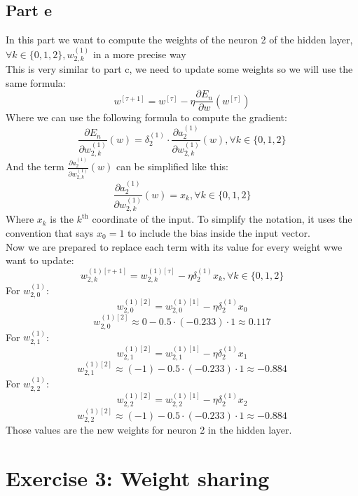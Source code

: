 \documentclass[a4paper, 10pt]{article}
\begin{document}
\subsection{Part e}
In this part we want to compute the weights of the neuron 2 of the hidden layer, $\forall k \in \{0,1,2\}, w_{2,k}^{(1)}$ in a more precise way 
\\
This is very similar to part c, we need to update some weights so we will use the same formula:
$$
w^{[\tau +1]} = w^{[\tau]} - \eta \frac{\partial E_n}{\partial w}(w^{[\tau]})
$$
Where we can use the following formula to compute the gradient:
$$
\frac{\partial E_n}{\partial w_{2,k}^{(1)}}(w) = \delta_2^{(1)} \cdot \frac{\partial a_2^{(1)}}{\partial w_{2,k}^{(1)}}(w),  \forall k\in\{0,1,2\} 
$$
And the term $\frac{\partial a_2^{(1)}}{\partial w_{2,k}^{(1)}}(w)$ can be simplified like this:
$$
\frac{\partial a_2^{(1)}}{\partial w_{2,k}^{(1)}}(w) = x_k, \forall k \in\{0,1,2\}
$$
Where $x_k$ is the $k^\text{th}$ coordinate of the input. To simplify the notation, it uses the convention that says $x_0=1$ to
include the bias inside the input vector.
\\
Now we are prepared to replace each term with its value for every weight wwe want to update:
$$
w_{2,k}^{(1)[\tau +1]} = w_{2,k}^{(1)[\tau]} - \eta \delta_2^{(1)}x_k, \forall k \in \{0,1,2\}
$$
For $w_{2,0}^{(1)}$:
$$
w_{2,0}^{(1)[2]} = w_{2,0}^{(1)[1]} - \eta \delta_2^{(1)}x_0
$$
$$
w_{2,0}^{(1)[2]} \approx 0 - 0.5\cdot(-0.233)\cdot1 \approx 0.117
$$
For $w_{2,1}^{(1)}$:
$$
w_{2,1}^{(1)[2]} = w_{2,1}^{(1)[1]} - \eta \delta_2^{(1)}x_1
$$
$$
w_{2,1}^{(1)[2]} \approx (-1) - 0.5\cdot(-0.233)\cdot1 \approx -0.884
$$
For $w_{2,2}^{(1)}$:
$$
w_{2,2}^{(1)[2]} = w_{2,2}^{(1)[1]} - \eta \delta_2^{(1)}x_2
$$
$$
w_{2,2}^{(1)[2]} \approx (-1) - 0.5\cdot(-0.233)\cdot1 \approx -0.884
$$
Those values are the new weights for neuron 2 in the hidden layer.

\section{Exercise 3: Weight sharing}
\end{document}

